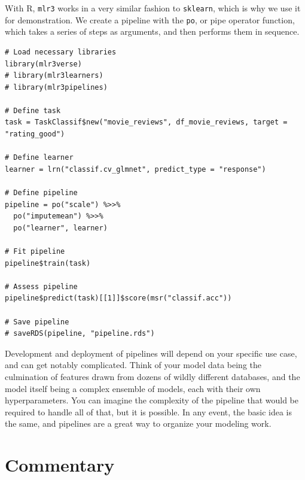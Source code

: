 \documentclass[
  letterpaper,
]{krantz}
\begin{document}
With R, \texttt{mlr3} works in a very similar fashion to
\texttt{sklearn}, which is why we use it for demonstration. We create a
pipeline with the \texttt{po}, or pipe operator function, which takes a
series of steps as arguments, and then performs them in sequence.

\begin{verbatim}
# Load necessary libraries
library(mlr3verse)
# library(mlr3learners)
# library(mlr3pipelines)

# Define task
task = TaskClassif$new("movie_reviews", df_movie_reviews, target = "rating_good")

# Define learner
learner = lrn("classif.cv_glmnet", predict_type = "response")

# Define pipeline
pipeline = po("scale") %>>%
  po("imputemean") %>>%
  po("learner", learner)

# Fit pipeline
pipeline$train(task)

# Assess pipeline
pipeline$predict(task)[[1]]$score(msr("classif.acc"))

# Save pipeline
# saveRDS(pipeline, "pipeline.rds")
\end{verbatim}

Development and deployment of pipelines will depend on your specific use
case, and can get notably complicated. Think of your model data being
the culmination of features drawn from dozens of wildly different
databases, and the model itself being a complex ensemble of models, each
with their own hyperparameters. You can imagine the complexity of the
pipeline that would be required to handle all of that, but it is
possible. In any event, the basic idea is the same, and pipelines are a
great way to organize your modeling work.

\section{Commentary}\label{commentary-1}
\end{document}
